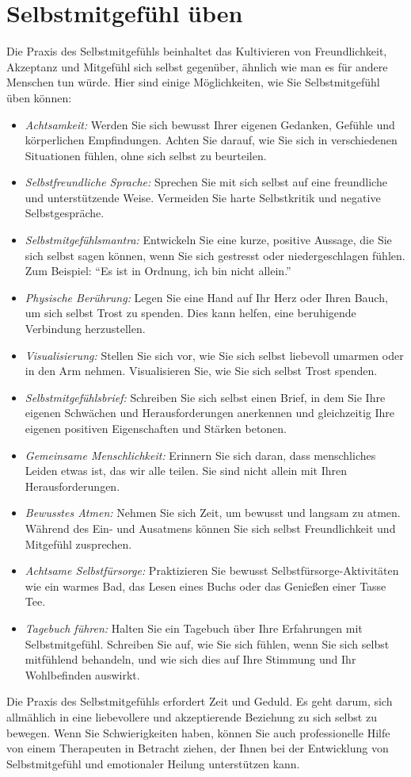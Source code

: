\section{Selbstmitgefühl üben}
Die Praxis des Selbstmitgefühls beinhaltet das Kultivieren von Freundlichkeit, Akzeptanz und Mitgefühl sich selbst gegenüber, ähnlich wie man es für andere Menschen tun würde. Hier sind einige Möglichkeiten, wie Sie Selbstmitgefühl üben können:
\begin{itemize}
    \item \emph{Achtsamkeit:} Werden Sie sich bewusst Ihrer eigenen Gedanken, Gefühle und körperlichen Empfindungen. Achten Sie darauf, wie Sie sich in verschiedenen Situationen fühlen, ohne sich selbst zu beurteilen.
    \item \emph{Selbstfreundliche Sprache:} Sprechen Sie mit sich selbst auf eine freundliche und unterstützende Weise. Vermeiden Sie harte Selbstkritik und negative Selbstgespräche.
    \item \emph{Selbstmitgefühlsmantra:} Entwickeln Sie eine kurze, positive Aussage, die Sie sich selbst sagen können, wenn Sie sich gestresst oder niedergeschlagen fühlen. Zum Beispiel: \enquote{Es ist in Ordnung, ich bin nicht allein.}
    \item \emph{Physische Berührung:} Legen Sie eine Hand auf Ihr Herz oder Ihren Bauch, um sich selbst Trost zu spenden. Dies kann helfen, eine beruhigende Verbindung herzustellen.
    \item \emph{Visualisierung:} Stellen Sie sich vor, wie Sie sich selbst liebevoll umarmen oder in den Arm nehmen. Visualisieren Sie, wie Sie sich selbst Trost spenden.
    \item \emph{Selbstmitgefühlsbrief:} Schreiben Sie sich selbst einen Brief, in dem Sie Ihre eigenen Schwächen und Herausforderungen anerkennen und gleichzeitig Ihre eigenen positiven Eigenschaften und Stärken betonen.
    \item \emph{Gemeinsame Menschlichkeit:} Erinnern Sie sich daran, dass menschliches Leiden etwas ist, das wir alle teilen. Sie sind nicht allein mit Ihren Herausforderungen.
    \item \emph{Bewusstes Atmen:} Nehmen Sie sich Zeit, um bewusst und langsam zu atmen. Während des Ein- und Ausatmens können Sie sich selbst Freundlichkeit und Mitgefühl zusprechen.
    \item \emph{Achtsame Selbstfürsorge:} Praktizieren Sie bewusst Selbstfürsorge-Aktivitäten wie ein warmes Bad, das Lesen eines Buchs oder das Genießen einer Tasse Tee.
    \item \emph{Tagebuch führen:} Halten Sie ein Tagebuch über Ihre Erfahrungen mit Selbstmitgefühl. Schreiben Sie auf, wie Sie sich fühlen, wenn Sie sich selbst mitfühlend behandeln, und wie sich dies auf Ihre Stimmung und Ihr Wohlbefinden auswirkt.
\end{itemize}
Die Praxis des Selbstmitgefühls erfordert Zeit und Geduld. Es geht darum, sich allmählich in eine liebevollere und akzeptierende Beziehung zu sich selbst zu bewegen. Wenn Sie Schwierigkeiten haben, können Sie auch professionelle Hilfe von einem Therapeuten in Betracht ziehen, der Ihnen bei der Entwicklung von Selbstmitgefühl und emotionaler Heilung unterstützen kann.



